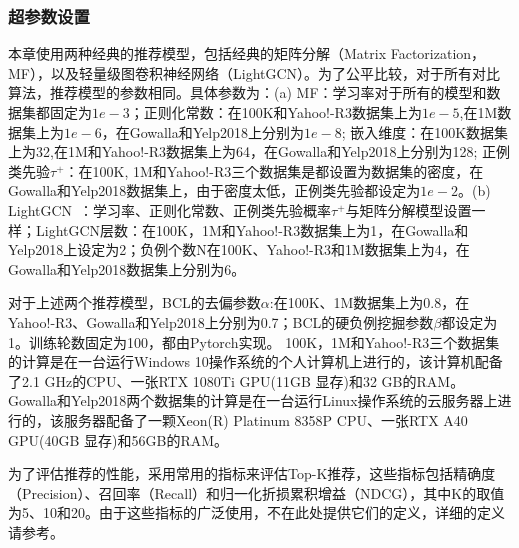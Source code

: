 \subsubsection{超参数设置}

本章使用两种经典的推荐模型，包括经典的矩阵分解（Matrix Factorization，MF）\cite{Koren:2009:Computer}，以及轻量级图卷积神经网络（LightGCN）\cite{Xiangnan:2020:SIGIR}。为了公平比较，对于所有对比算法，推荐模型的参数相同。具体参数为：(a) MF：学习率对于所有的模型和数据集都固定为$1e-3$；正则化常数：在100K和Yahoo!-R3数据集上为$1e-5$,在1M数据集上为$1e-6$，在Gowalla和Yelp2018上分别为$1e-8$; 嵌入维度：在100K数据集上为32,在1M和Yahoo!-R3数据集上为64，在Gowalla和Yelp2018上分别为128; 正例类先验$\tau^+$：在100K, 1M和Yahoo!-R3三个数据集是都设置为数据集的密度，在Gowalla和Yelp2018数据集上，由于密度太低，正例类先验都设定为$1e-2$。(b) LightGCN~\cite{Xiangnan:2020:SIGIR}：学习率、正则化常数、正例类先验概率$\tau^+$与矩阵分解模型设置一样；LightGCN层数：在100K，1M和Yahoo!-R3数据集上为1，在Gowalla和Yelp2018上设定为2；负例个数N在100K、Yahoo!-R3和1M数据集上为4，在Gowalla和Yelp2018数据集上分别为6。

对于上述两个推荐模型，BCL的去偏参数$\alpha$:在100K、1M数据集上为0.8，在Yahoo!-R3、Gowalla和Yelp2018上分别为0.7；BCL的硬负例挖掘参数$\beta$都设定为1。训练轮数固定为100，都由Pytorch实现。
100K，1M和Yahoo!-R3三个数据集的计算是在一台运行Windows 10操作系统的个人计算机上进行的，该计算机配备了2.1 GHz的CPU、一张RTX 1080Ti GPU(11GB 显存)和32 GB的RAM。Gowalla和Yelp2018两个数据集的计算是在一台运行Linux操作系统的云服务器上进行的，该服务器配备了一颗Xeon(R) Platinum 8358P CPU、一张RTX A40 GPU(40GB 显存)和56GB的RAM。

为了评估推荐的性能，采用常用的指标来评估Top-K推荐，这些指标包括精确度（Precision）、召回率（Recall）和归一化折损累积增益（NDCG），其中K的取值为5、10和20。由于这些指标的广泛使用，不在此处提供它们的定义，详细的定义请参考\cite{ml:2018}。

